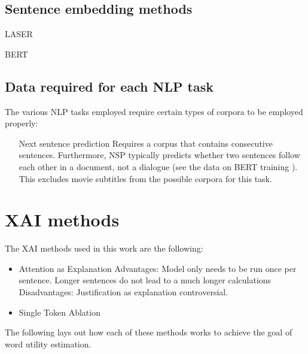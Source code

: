 \subsection{Sentence embedding methods}

\begin{description}
	\item[LASER] \cite{artetxeMassivelyMultilingualSentence2019}
	\item[BERT] \cite{reimersMakingMonolingualSentence2020}
\end{description}

\subsection{Data required for each NLP task}
The various NLP tasks employed require certain types of corpora to be employed properly:

\begin{itemize}
	\item[Next sentence prediction]
	      Requires a corpus that contains consecutive sentences.
	      Furthermore, NSP typically predicts whether two sentences follow each other in a document, not a dialogue (see the data on BERT training \cite{kentonBertPretrainingDeep2019}).
	      This excludes movie subtitles from the possible corpora for this task.

\end{itemize}

\section{XAI methods}

The XAI methods used in this work are the following:
\begin{itemize}
	\item Attention as Explanation
	      Advantages:
	      Model only needs to be run once per sentence.
	      Longer sentences do not lead to a much longer calculations
	      Disadvantages: Justification as explanation controversial.
	\item Single Token Ablation
\end{itemize}

The following lays out how each of these methods works to achieve the goal of word utility estimation.

